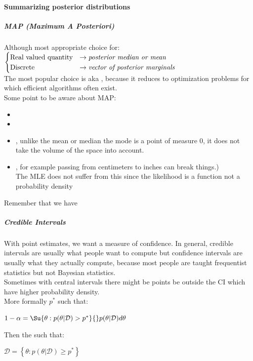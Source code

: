 \paragraph{Summarizing posterior distributions}
\subparagraph{MAP (Maximum A Posteriori)}
Although most appropriate choice for:
$
\begin{cases}
	\text{Real valued quantity} &\rightarrow \text{\emph{posterior median or mean}}\\
	\text{Discrete} &\rightarrow \text{\emph{vector of posterior marginals}}
\end{cases}
$\\
The most popular choice is  aka , because it reduces to
optimization problems for which efficient algorithms often exist.\\
Some point to be aware about MAP:
\begin{itemize}
	\item {}
	\item {}
	\item {}, unlike the mean or median the mode is a
		point of measure 0, it does not take the volume of the space into account.
	\item {}, for example 
		passing from centimeters to inches can break things.)\\ The MLE does not
		suffer from this since the likelihood is a function not a probability
		density
\end{itemize}

Remember that we have 

\subparagraph{Credible Intervals}
With point estimates, we want a measure of confidence. 
In general, credible intervals are usually what people want to compute but confidence
intervals are usually what they actually compute, because most people are taught 
frequentist statistics but not Bayesian statistics.\\
Sometimes with central intervals there might be points be outside the CI which have higher
probability density.\\
More formally $p^{*}$ such that: 
\begin{center}
	$1-\alpha = 
	\Su{{\theta:p(\theta|\mathcal{D})>p^{*}}}{}p(\theta|\mathcal{D})d\theta$
\end{center}
Then the  such that:
\begin{center}
	$\mathcal{D}=\left\{\theta: p(\theta|\mathcal{D})\geq p^{*}\right\}$
\end{center}
